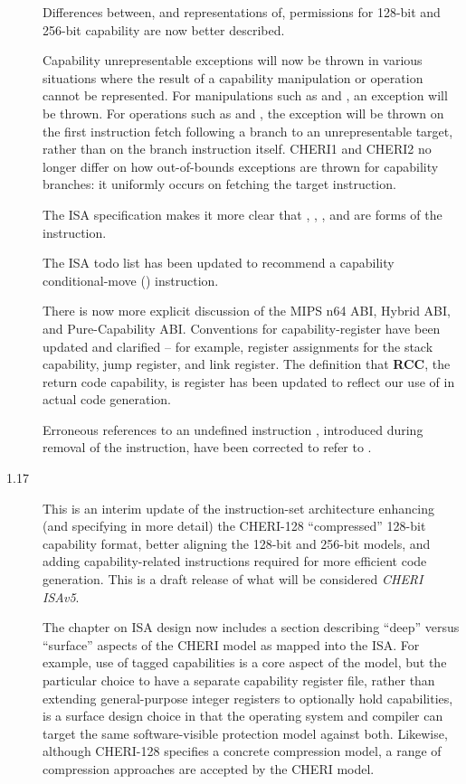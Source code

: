 \begin{description}
  Differences between, and representations of, permissions for 128-bit and
  256-bit capability are now better described.

  Capability unrepresentable exceptions will now be thrown in various
  situations where the result of a capability manipulation or operation cannot
  be represented.
  For manipulations such as  and ,
  an exception will be thrown.
  For operations such as  and , the
  exception will be thrown on the first instruction fetch following a branch
  to an unrepresentable target, rather than on the branch instruction itself.
  CHERI1 and CHERI2 no longer differ on how out-of-bounds exceptions are
  thrown for capability branches: it uniformly occurs on fetching the target
  instruction.

  The ISA specification makes it more clear that ,
  , , and  are
  forms of the  instruction.

  The ISA todo list has been updated to recommend a capability
  conditional-move () instruction.

  There is now more explicit discussion of the MIPS n64 ABI, Hybrid ABI,
  and Pure-Capability ABI.
  Conventions for capability-register have been updated and clarified --
  for example, register assignments for the stack capability, jump register,
  and link register.
  The definition that {\bf RCC}, the return code capability, is register
   has been updated to reflect our use of  in actual code
  generation.

  Erroneous references to an undefined instruction ,
  introduced during removal of the  instruction, have
  been corrected to refer to .

\item[1.17] This is an interim update of the instruction-set architecture
  enhancing (and specifying in more detail) the CHERI-128 ``compressed''
  128-bit capability format, better aligning the 128-bit and 256-bit models,
  and adding capability-related instructions required for more efficient code
  generation.
  This is a draft release of what will be considered \textit{CHERI ISAv5}.

  The chapter on ISA design now includes a section describing ``deep'' versus
  ``surface'' aspects of the CHERI model as mapped into the ISA.
  For example, use of tagged capabilities is a core aspect of the model, but
  the particular choice to have a separate capability register file, rather
  than extending general-purpose integer registers to optionally hold capabilities, is
  a surface design choice in that the operating system and compiler can target
  the same software-visible protection model against both.
  Likewise, although CHERI-128 specifies a concrete compression model, a range
  of compression approaches are accepted by the CHERI model.


\end{description}
